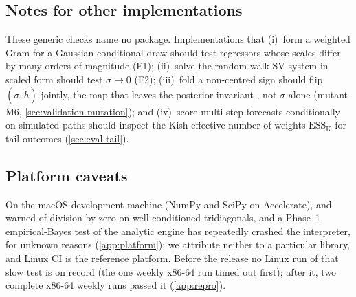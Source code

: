 \subsection{Notes for other implementations}\label{sec:robustness-notes}

These generic checks name no package.
Implementations that (i)~form a weighted Gram for a Gaussian conditional draw should test regressors whose scales differ by many orders of magnitude (F1); (ii)~solve the random-walk SV system in scaled form should test $\sigma \to 0$ (F2); (iii)~fold a non-centred sign should flip $(\sigma, \tilde h)$ jointly, the map that leaves the posterior invariant \citep{fruhwirth2010stochastic}, not $\sigma$ alone (mutant M6, \cref{sec:validation-mutation}); and (iv)~score multi-step forecasts conditionally on simulated paths should inspect the Kish effective number of weights $\mathrm{ESS}_{\mathrm{K}}$ for tail outcomes (\cref{sec:eval-tail}).

\subsection{Platform caveats}\label{sec:robustness-platform}

On the macOS development machine (NumPy and SciPy on Accelerate),  and  warned of division by zero on well-conditioned tridiagonals, and a Phase~1 empirical-Bayes test of the analytic engine has repeatedly crashed the interpreter, for unknown reasons (\cref{app:platform}); we attribute neither to a particular library, and Linux CI is the reference platform. %
Before the release no Linux run of that slow test is on record (the one weekly x86-64 run timed out first); after it, two complete x86-64 weekly runs passed it (\cref{app:repro}). %
